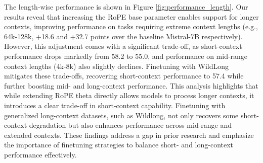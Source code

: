 The length-wise performance is shown in Figure \ref{fig:performance_length}. Our results reveal that increasing the RoPE base parameter enables support for longer contexts, improving performance on tasks requiring extreme context lengths (e.g., 64k-128k, +18.6 and +32.7 points over the baseline Mistral-7B respectively). 
However, this adjustment comes with a significant trade-off, as short-context performance drops markedly from 58.2 to 55.0, and performance on mid-range context lengths (4k-8k) also slightly declines. 
Finetuning with WildLong mitigates these trade-offs, recovering short-context performance to 57.4 while further boosting mid- and long-context performance.
This analysis highlights that while extending RoPE theta directly allows models to process longer contexts, it introduces a clear trade-off in short-context capability. Finetuning with generalized long-context datasets, such as Wildlong, not only recovers some short-context degradation but also enhances performance across mid-range and extended contexts. These findings address a gap in prior research and emphasize the importance of finetuning strategies to balance short- and long-context performance effectively.





